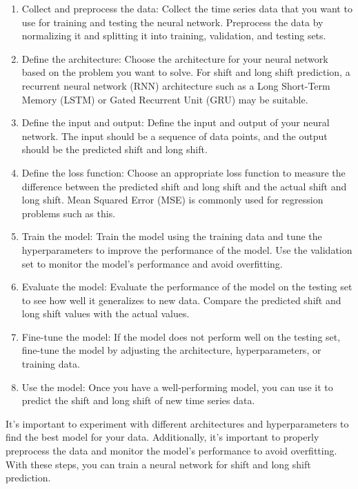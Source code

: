         \begin{enumerate}
            \item Collect and preprocess the data: Collect the time series data that you want to use for training and testing the neural network.
            Preprocess the data by normalizing it and splitting it into training, validation, and testing sets.
            \item Define the architecture: Choose the architecture for your neural network based on the problem you want to solve. For shift and long
            shift prediction, a recurrent neural network (RNN) architecture such as a Long Short-Term Memory (LSTM) or Gated Recurrent Unit (GRU) may be suitable.
            \item Define the input and output: Define the input and output of your neural network. The input should be a sequence of data
            points, and the output should be the predicted shift and long shift.
            \item Define the loss function: Choose an appropriate loss function to measure the difference between the predicted
            shift and long shift and the actual shift and long shift. Mean Squared Error (MSE) is commonly used for regression problems such as this.
            \item Train the model: Train the model using the training data and tune the hyperparameters to improve the performance of the model.
            Use the validation set to monitor the model's performance and avoid overfitting.
            \item Evaluate the model: Evaluate the performance of the model on the testing set to see how well it generalizes to new data.
            Compare the predicted shift and long shift values with the actual values.
            \item Fine-tune the model: If the model does not perform well on the testing set, fine-tune the model by adjusting the architecture,
            hyperparameters, or training data.
            \item Use the model: Once you have a well-performing model, you can use it to predict the shift and long shift of new time series data.
        \end{enumerate}
        It's important to experiment with different architectures and hyperparameters to find the best model for your data.
        Additionally, it's important to properly preprocess the data and monitor the model's performance to avoid overfitting.
        With these steps, you can train a neural network for shift and long shift prediction.\\
